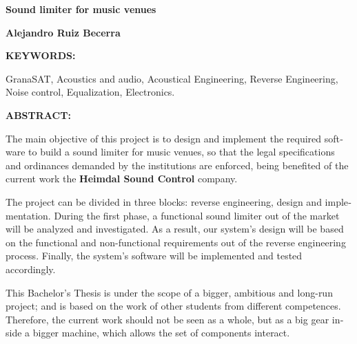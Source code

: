 \vspace{1.25cm}
\newpage
\vspace{-1.15cm}

\begin{otherlanguage}{english}

\begin{center}
\textbf{\Large Sound limiter for music venues}
\par\end{center}{\Large \par}

\begin{center}
\textbf{\large Alejandro Ruiz Becerra}
\par\end{center}{\large \par}

\vspace{0.75cm}
\begin{doublespace}
\noindent \textbf{KEYWORDS:}
\end{doublespace}

\begin{singlespace}

    \noindent GranaSAT, Acoustics and audio, Acoustical Engineering, Reverse Engineering, Noise control, Equalization, Electronics.

\end{singlespace}

\begin{doublespace}
\noindent \textbf{ABSTRACT:}
\end{doublespace}

\begin{singlespace}

    \noindent The main objective of this project is to design and implement the required software to build a sound limiter for music venues, so that the legal specifications and ordinances demanded by the institutions are enforced, being benefited of the current work the \textbf{Heimdal Sound Control} company.

    \noindent The project can be divided in three blocks: reverse engineering, design and implementation. During the first phase, a functional sound limiter out of the market will be analyzed and investigated. As a result, our system's design will be based on the functional and non-functional requirements out of the reverse engineering process. Finally, the system's software will be implemented and tested accordingly.

    \noindent This Bachelor's Thesis is under the scope of a bigger, ambitious and long-run project; and is based on the work of other students from different competences. Therefore, the current work should not be seen as a whole, but as a big gear inside a bigger machine, which allows the set of components interact.


\end{singlespace}
\end{otherlanguage}
